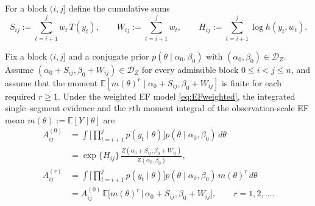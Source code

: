 For a block $(i,j]$ define the cumulative sums
\[
S_{ij} := \sum_{t=i+1}^j w_t\,T(y_t),\qquad
W_{ij} := \sum_{t=i+1}^j w_t,\qquad
H_{ij} := \sum_{t=i+1}^j \log h(y_t,w_t).
\]

\begin{theorem}
\label{thm:ef-integral}
Fix a block $(i,j]$ and a conjugate prior $p(\theta\mid\alpha_0,\beta_0)$ with
$(\alpha_0,\beta_0)\in\mathcal{D}_Z$. Assume
$(\alpha_0+S_{ij},\beta_0+W_{ij})\in\mathcal{D}_Z$ for every admissible block
$0\le i<j\le n$, and assume that the moment
$\mathbb{E}[m(\theta)^r\mid\alpha_0+S_{ij},\beta_0+W_{ij}]$ is finite for each required
$r\ge 1$. Under the weighted EF model \eqref{eq:EFweighted}, the integrated single--segment
evidence and the $r$th moment integral of the observation-scale EF mean
$m(\theta):=\mathbb{E}[Y\mid\theta]$ are
\begin{align}
A^{(0)}_{ij}
 &= \int \Big[\prod_{t=i+1}^j p(y_t\mid\theta)\Big]
      p(\theta\mid\alpha_0,\beta_0)\,d\theta \nonumber\\
 &= \exp\{H_{ij}\}\,
      \frac{Z(\alpha_0 + S_{ij},\beta_0 + W_{ij})}{Z(\alpha_0,\beta_0)},
      \label{eq:A0}\\
A^{(r)}_{ij}
 &= \int \Big[\prod_{t=i+1}^j p(y_t\mid\theta)\Big]
      p(\theta\mid\alpha_0,\beta_0)\,m(\theta)^r\,d\theta \nonumber\\
 &= A^{(0)}_{ij}\,
    \mathbb{E}\!\big[m(\theta)^r
      \,\big|\,\alpha_0+S_{ij},\beta_0+W_{ij}\big],
      \qquad r=1,2,\dots.
      \label{eq:Ar}
\end{align}
\end{theorem}

